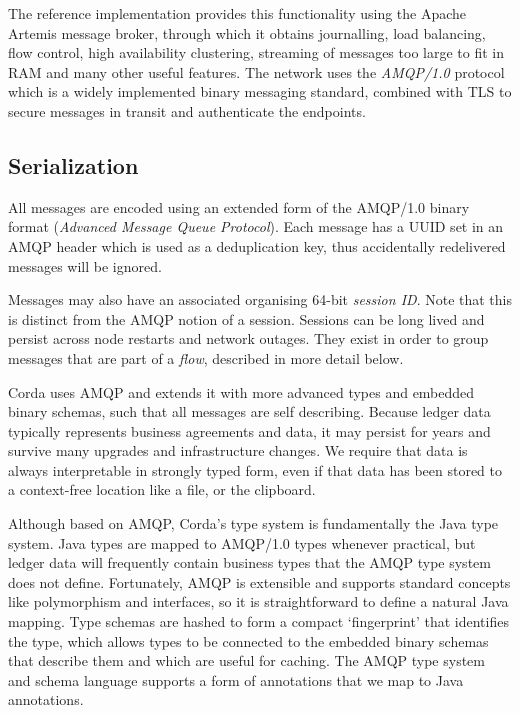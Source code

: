 \documentclass{article}
\begin{document}
The reference implementation provides this functionality using the Apache Artemis message broker, through which it
obtains journalling, load balancing, flow control, high availability clustering, streaming of messages too large to
fit in RAM and many other useful features. The network uses the \emph{AMQP/1.0}\cite{AMQP} protocol which is a
widely implemented binary messaging standard, combined with TLS to secure messages in transit and authenticate the
endpoints.

\subsection{Serialization}\label{subsec:serialization}

All messages are encoded using an extended form of the AMQP/1.0 binary format (\emph{Advanced Message Queue
Protocol}\cite{AMQP}). Each message has a UUID set in an AMQP header which is used as a deduplication key, thus
accidentally redelivered messages will be ignored.

Messages may also have an associated organising 64-bit \emph{session ID}. Note that this is distinct from the AMQP
notion of a session. Sessions can be long lived and persist across node restarts and network outages. They exist in
order to group messages that are part of a \emph{flow}, described in more detail below.

Corda uses AMQP and extends it with more advanced types and embedded binary schemas, such that all messages are
self describing. Because ledger data typically represents business agreements and data, it may persist for years
and survive many upgrades and infrastructure changes. We require that data is always interpretable in strongly
typed form, even if that data has been stored to a context-free location like a file, or the clipboard.

Although based on AMQP, Corda's type system is fundamentally the Java type system. Java types are mapped to
AMQP/1.0 types whenever practical, but ledger data will frequently contain business types that the AMQP type system
does not define. Fortunately, AMQP is extensible and supports standard concepts like polymorphism and interfaces,
so it is straightforward to define a natural Java mapping. Type schemas are hashed to form a compact `fingerprint'
that identifies the type, which allows types to be connected to the embedded binary schemas that describe them and
which are useful for caching. The AMQP type system and schema language supports a form of annotations that we map
to Java annotations.
\end{document}
